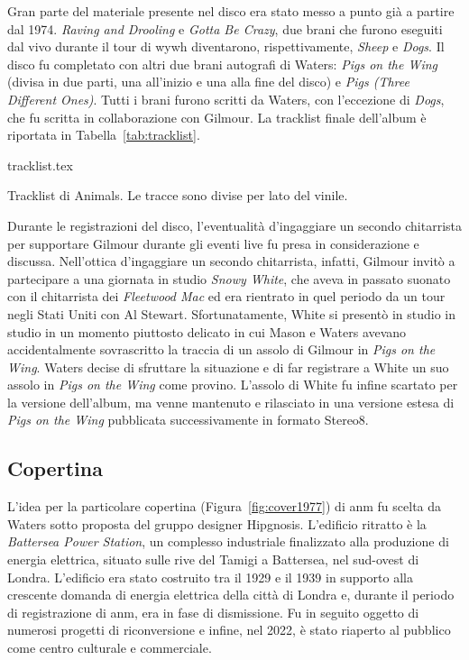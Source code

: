 \documentclass[class=book, crop=false, oneside, 12pt]{standalone}
\begin{document}
    Gran parte del materiale presente nel disco era stato messo a punto già a partire dal 1974.  \emph{Raving and Drooling} e \emph{Gotta Be Crazy}, due brani che furono eseguiti dal vivo durante il tour di \acrshort{wywh} diventarono, rispettivamente, \emph{Sheep} e \emph{Dogs}. Il disco fu completato con altri due brani autografi di Waters: \emph{Pigs on the Wing} (divisa in due parti, una all'inizio e una alla fine del disco) e \emph{Pigs (Three Different Ones)}. Tutti i brani furono scritti da Waters, con l'eccezione di \emph{Dogs}, che fu scritta in collaborazione con Gilmour. La tracklist finale dell'album è riportata in Tabella~\ref{tab:tracklist}.

    \begin{table}[t]
        \centering
        {tracklist.tex}
        \caption{Tracklist di Animals. Le tracce sono divise per lato del vinile.}
        \label{tab:tracklist}
    \end{table}
    
    Durante le registrazioni del disco, l'eventualità d'ingaggiare un secondo chitarrista per supportare Gilmour durante gli eventi live fu presa in considerazione e discussa. Nell'ottica d'ingaggiare un secondo chitarrista, infatti, Gilmour invitò a partecipare a una giornata in studio \emph{Snowy White}, che aveva in passato suonato con il chitarrista dei \emph{Fleetwood Mac} ed era rientrato in quel periodo da un tour negli Stati Uniti con Al Stewart. Sfortunatamente, White si presentò in studio in studio in un momento piuttosto delicato in cui Mason e Waters avevano accidentalmente sovrascritto la traccia di un assolo di Gilmour in \emph{Pigs on the Wing}. Waters decise di sfruttare la situazione e di far registrare a White un suo assolo in \emph{Pigs on the Wing} come provino\cite{mason2017inside}. L'assolo di White fu infine scartato per la versione dell'album, ma venne mantenuto e rilasciato in una versione estesa di \emph{Pigs on the Wing} pubblicata successivamente in formato Stereo8.
    
    \subsection{Copertina}
    L'idea per la particolare copertina (Figura~\ref{fig:cover1977}) di \acrshort{anm} fu scelta da Waters sotto proposta del gruppo designer Hipgnosis\cite{pinkfloyd2022animalsdocumentary}. L'edificio ritratto è la \emph{Battersea Power Station}, un complesso industriale finalizzato alla produzione di energia elettrica, situato sulle rive del Tamigi a Battersea, nel sud-ovest di Londra. L'edificio era stato costruito tra il 1929 e il 1939 in supporto alla crescente domanda di energia elettrica della città di Londra e, durante il periodo di registrazione di \acrshort{anm}, era in fase di dismissione. Fu in seguito oggetto di numerosi progetti di riconversione e infine, nel 2022, è stato riaperto al pubblico come centro culturale e commerciale.
\end{document}

